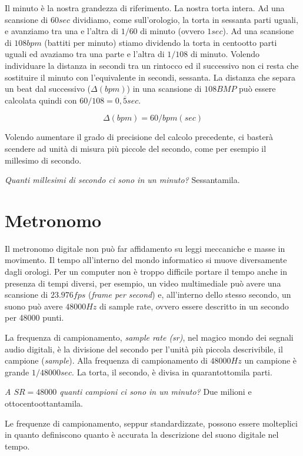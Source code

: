 Il minuto è la nostra grandezza di riferimento. La nostra torta intera. Ad una
scansione di $60sec$ dividiamo, come sull'orologio, la torta in sessanta parti
uguali, e avanziamo tra una e l'altra di $1/60$ di minuto (ovvero $1sec$).
Ad una scansione di $108bpm$ (battiti per minuto) stiamo dividendo la torta in
centootto parti uguali ed avaziamo tra una parte e l'altra di $1/108$ di minuto.
Volendo individuare la distanza in secondi tra un rintocco ed il successivo non
ci resta che sostituire il minuto con l'equivalente in secondi, sessanta. La
distanza che separa un beat dal successivo ($\Delta(bpm)$) in una scansione di $108BMP$ può
essere calcolata quindi con $60/108=0,\overline{5}sec$.

\begin{equation}
\Delta(bpm) = 60/bpm (sec)
\end{equation}

Volendo aumentare il grado di precisione del calcolo precedente, ci basterà scendere
ad unità di misura più piccole del secondo, come per esempio il millesimo di secondo.

\emph{Quanti millesimi di secondo ci sono in un minuto?} Sessantamila.

\section{Metronomo}

Il metronomo digitale non può far affidamento su leggi meccaniche e masse in
movimento. Il tempo all'interno del mondo informatico si muove diversamente dagli
orologi. Per un computer non è troppo difficile portare il tempo anche in
presenza di tempi diversi, per esempio, un video multimediale può avere una scansione
di $23.976fps$ (\emph{frame per second}) e, all'interno dello stesso secondo, un suono
può avere $48000Hz$ di sample rate, ovvero essere descritto in un secondo per 48000 punti.

La frequenza di campionamento, \emph{sample rate (sr)}, nel magico mondo dei
segnali audio digitali, è la divisione del secondo per l'unità più piccola descrivibile,
il campione (\emph{sample}). Alla frequenza di campionamento di $48000Hz$ un campione
è grande $1/48000sec$. La torta, il secondo, è divisa in quarantottomila parti.

\emph{A $SR=48000$ quanti campioni ci sono in un minuto?} Due milioni e ottocentoottantamila.

Le frequenze di campionamento, seppur standardizzate, possono essere molteplici in
quanto definiscono quanto è accurata la descrizione del suono digitale nel tempo.

